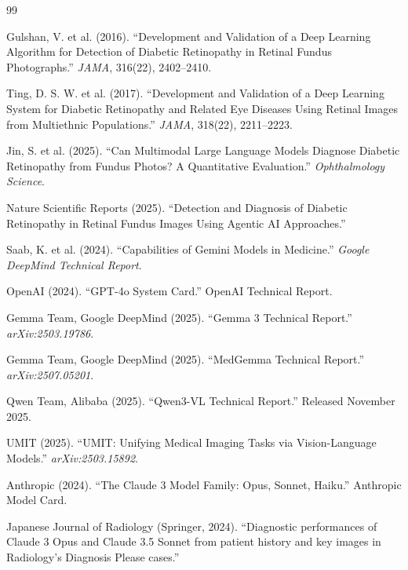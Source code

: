 \documentclass[11pt,a4paper]{article}
\begin{document}
\begin{thebibliography}{99}

Gulshan, V. et al. (2016). ``Development and Validation of a Deep Learning Algorithm for Detection of Diabetic Retinopathy in Retinal Fundus Photographs.'' \textit{JAMA}, 316(22), 2402--2410.

Ting, D. S. W. et al. (2017). ``Development and Validation of a Deep Learning System for Diabetic Retinopathy and Related Eye Diseases Using Retinal Images from Multiethnic Populations.'' \textit{JAMA}, 318(22), 2211--2223.

Jin, S. et al. (2025). ``Can Multimodal Large Language Models Diagnose Diabetic Retinopathy from Fundus Photos? A Quantitative Evaluation.'' \textit{Ophthalmology Science}.

Nature Scientific Reports (2025). ``Detection and Diagnosis of Diabetic Retinopathy in Retinal Fundus Images Using Agentic AI Approaches.''

Saab, K. et al. (2024). ``Capabilities of Gemini Models in Medicine.'' \textit{Google DeepMind Technical Report}.

OpenAI (2024). ``GPT-4o System Card.'' OpenAI Technical Report.

Gemma Team, Google DeepMind (2025). ``Gemma 3 Technical Report.'' \textit{arXiv:2503.19786}.

Gemma Team, Google DeepMind (2025). ``MedGemma Technical Report.'' \textit{arXiv:2507.05201}.

Qwen Team, Alibaba (2025). ``Qwen3-VL Technical Report.'' Released November 2025.

UMIT (2025). ``UMIT: Unifying Medical Imaging Tasks via Vision-Language Models.'' \textit{arXiv:2503.15892}.

Anthropic (2024). ``The Claude 3 Model Family: Opus, Sonnet, Haiku.'' Anthropic Model Card.

Japanese Journal of Radiology (Springer, 2024). ``Diagnostic performances of Claude 3 Opus and Claude 3.5 Sonnet from patient history and key images in Radiology's Diagnosis Please cases.''


\end{thebibliography}
\end{document}

